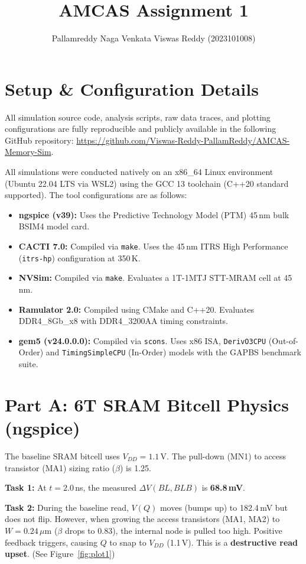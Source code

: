 \documentclass[11pt,a4paper]{article}
\title{\textbf{AMCAS Assignment 1}}
\author{Pallamreddy Naga Venkata Viswas Reddy (2023101008)}
\date{}
\begin{document}
\maketitle

\section*{Setup \& Configuration Details}
All simulation source code, analysis scripts, raw data traces, and plotting configurations are fully reproducible and publicly available in the following GitHub repository: \url{https://github.com/Viswas-Reddy-PallamReddy/AMCAS-Memory-Sim}.


All simulations were conducted natively on an x86\_64 Linux environment (Ubuntu 22.04 LTS via WSL2) using the GCC 13 toolchain (C++20 standard supported). The tool configurations are as follows:
\begin{itemize}
    \item \textbf{ngspice (v39):} Uses the Predictive Technology Model (PTM) 45\,nm bulk BSIM4 model card.
    \item \textbf{CACTI 7.0:} Compiled via \texttt{make}. Uses the 45\,nm ITRS High Performance (\texttt{itrs-hp}) configuration at 350\,K.
    \item \textbf{NVSim:} Compiled via \texttt{make}. Evaluates a 1T-1MTJ STT-MRAM cell at 45\,nm.
    \item \textbf{Ramulator 2.0:} Compiled using CMake and C++20. Evaluates DDR4\_8Gb\_x8 with DDR4\_3200AA timing constraints.
    \item \textbf{gem5 (v24.0.0.0):} Compiled via \texttt{scons}. Uses x86 ISA, \texttt{DerivO3CPU} (Out-of-Order) and \texttt{TimingSimpleCPU} (In-Order) models with the GAPBS benchmark suite.
\end{itemize}

\section{Part A: 6T SRAM Bitcell Physics (ngspice)}
The baseline SRAM bitcell uses $V_{DD}=1.1$\,V. The pull-down (MN1) to access transistor (MA1) sizing ratio ($\beta$) is 1.25.

\textbf{Task 1:} At $t = 2.0$\,ns, the measured $\Delta V(BL,BLB)$ is \textbf{68.8\,mV}. 

\textbf{Task 2:} During the baseline read, $V(Q)$ moves (bumps up) to 182.4\,mV but does not flip. However, when growing the access transistors (MA1, MA2) to $W = 0.24\,\mu$m ($\beta$ drops to 0.83), the internal node is pulled too high. Positive feedback triggers, causing $Q$ to snap to $V_{DD}$ (1.1\,V). This is a \textbf{destructive read upset}. (See Figure~\ref{fig:plot1})
\end{document}
